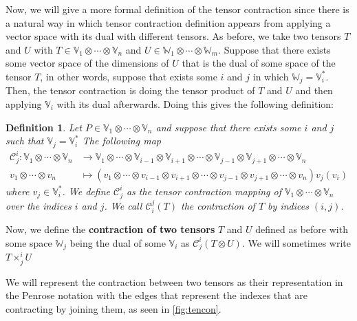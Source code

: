 \documentclass[11pt,a4paper,openright,oneside]{book}
\numberwithin{equation}{section}
\newtheorem{defn0}{Definition}[chapter]
\newenvironment{definition}{ \begin{defn0}}{\end{defn0}}
\newcommand{\figref}[1]{\cref{#1}}
\begin{document}
Now, we will give a more formal definition of the tensor contraction since there is a natural way in which tensor contraction definition
appears from applying a vector space with its dual with different tensors. As before, we take two tensors $T$ and $U$ with
$T \in \mathbb{V}_1 \otimes \cdots \otimes \mathbb{V}_n$ and $U \in \mathbb{W}_1 \otimes \cdots \otimes \mathbb{W}_m$. Suppose that there exists
some vector space of the dimensions of $U$ that is the dual of some space of the tensor $T$, in other words, suppose that exists
some $i$ and $j$ in which $\mathbb{W}_j = \mathbb{V}_i^*$. Then, the tensor contraction is doing the tensor product of $T$ and $U$ and then applying
$\mathbb{V}_i$ with its dual afterwards. Doing this gives the following definition:

\begin{definition}
    Let $P \in \mathbb{V}_1 \otimes \cdots \otimes \mathbb{V}_n$
    and suppose that there exists some $i$ and $j$ such
    that $\mathbb{V}_j = \mathbb{V}_i^*$ The following map
    $$
    \begin{align}
    \mathcal{C}_j^i: 
    \mathbb{V}_1 \otimes \cdots \otimes \mathbb{V}_n &\longrightarrow 
    \mathbb{V}_1 \otimes \cdots \otimes \mathbb{V}_{i-1} \otimes \mathbb{V}_{i+1} \otimes \cdots \otimes \mathbb{V}_{j-1} \otimes \mathbb{V}_{j+1} \otimes \cdots \otimes \mathbb{V}_n \\
 v_1 \otimes \cdots \otimes v_n
                                                     &\longmapsto \left( v_1 \otimes \cdots \otimes v_{i-1} \otimes v_{i+1} \otimes \cdots \otimes v_{j-1} \otimes v_{j+1} \otimes \cdots \otimes v_n \right) v_j(v_i)
\end{align}
$$
where $v_j \in \mathbb{V}_i^*$. We define 
$\mathcal{C}_j^i$ as the tensor contraction mapping of $\mathbb{V}_1 \otimes \cdots \otimes \mathbb{V}_n$ over the indices $i$ and $j$.
We call $\mathcal{C}_i^j(T)$ the contraction of $T$ by indices $(i,j)$.
\label{def:contraction}
\end{definition}

Now, we define the \textbf{contraction of two tensors} $T$ and $U$ defined as before with some space $\mathbb{W}_j$ being the dual of
some $\mathbb{V}_i$ as $\mathcal{C}_j^i (T \otimes U)$. We will sometimes write $T \times_j^i U$

We will represent the contraction between two tensors 
as their representation in the Penrose notation with the edges that represent the indexes that are contracting by joining them, as seen in \figref{fig:tencon}.
\end{document}
